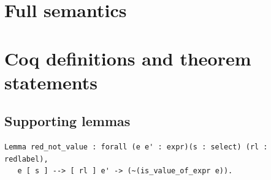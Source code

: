 \documentclass[12pt,twoside,notitlepage]{report}
\theoremstyle{plain}%
\theoremstyle{definition}
\theoremstyle{remark}
\begin{document}
\cleardoublepage



\cleardoublepage

\appendix

\chapter{Full semantics}
\ottall
\label{chap:fullsemantics}









\chapter{Coq definitions and theorem statements}
\label{cha:full_proof_statements}
\section{Supporting lemmas}
\begin{minipage}{\linewidth}
\begin{lstlisting}[language={Coq}, caption={If an expression reduces, it is not value}, label={lst:red_not_value}]
Lemma red_not_value : forall (e e' : expr)(s : select) (rl : redlabel),  
   e [ s ] --> [ rl ] e' -> (~(is_value_of_expr e)).
\end{lstlisting}
\end{minipage}
\end{document}
